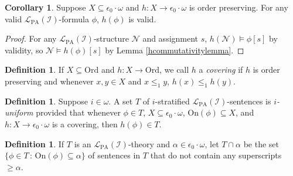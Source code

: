 \documentclass[reqno]{article}
\theoremstyle{definition}
\newtheorem{lemma}[theorem]{Lemma}
\newtheorem{corollary}[theorem]{Corollary}
\newtheorem{definition}[theorem]{Definition}
\def\L{\mathscr{L}}
\def\LPA{\L_{\mathrm{PA}}}
\def\Ord{\mathrm{Ord}}
\def\epom{\epsilon_0\cdot\omega}
\def\indset{\mathcal I}
\def\onset{\mathrm{On}}
\begin{document}
\begin{corollary}
\label{hpreserversvalidity}
Suppose $X\subseteq\epom$ and $h:X\to\epom$ is order preserving.
For any valid $\LPA(\indset)$-formula $\phi$,
$h(\phi)$ is valid.
\end{corollary}

\begin{proof}
For any $\LPA(\indset)$-structure $\mathscr N$ and assignment $s$,
$h(\mathscr N)\models\phi[s]$ by validity, so $\mathscr N\models h(\phi)[s]$
by Lemma \ref{hcommutativitylemma}.
\end{proof}
%
%

\begin{definition}
If $X\subseteq\Ord$ and $h:X\to\Ord$, we call $h$ a \emph{covering}
if $h$ is order preserving and whenever $x,y\in X$
and $x\leq_1 y$, $h(x)\leq_1 h(y)$.
\end{definition}

\begin{definition}
Suppose $i\in\omega$.
A set $T$ of $i$-stratified $\LPA(\indset)$-sentences is \emph{$i$-uniform}
provided that whenever $\phi\in T$,
$X\subseteq\epom$, $\onset(\phi)\subseteq X$, and $h:X\to\epom$ is a covering,
then $h(\phi)\in T$.
\end{definition}

%
%
%

\begin{definition}
If $T$ is an $\LPA(\indset)$-theory and $\alpha\in\epom$,
let $T\cap\alpha$ be the set $\{\phi\in T\,:\,\onset(\phi)\subseteq\alpha\}$ of sentences in $T$ that do not contain
any superscripts $\geq\alpha$.
\end{definition}
\end{document}
